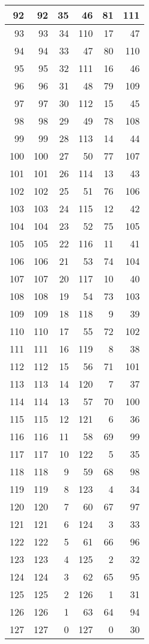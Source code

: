 \begin{longtable}{|r|r|r|r|r|r|}
      92&92&35&46&81&111\\
      \hline 
      93&93&34&110&17&47\\
      \hline 
      94&94&33&47&80&110\\
      \hline 
      95&95&32&111&16&46\\
      \hline 
      96&96&31&48&79&109\\
      \hline 
      97&97&30&112&15&45\\
      \hline 
      98&98&29&49&78&108\\
      \hline 
      99&99&28&113&14&44\\
      \hline 
      100&100&27&50&77&107\\
      \hline 
      101&101&26&114&13&43\\
      \hline 
      102&102&25&51&76&106\\
      \hline 
      103&103&24&115&12&42\\
      \hline 
      104&104&23&52&75&105\\
      \hline 
      105&105&22&116&11&41\\
      \hline 
      106&106&21&53&74&104\\
      \hline 
      107&107&20&117&10&40\\
      \hline 
      108&108&19&54&73&103\\
      \hline 
      109&109&18&118&9&39\\
      \hline 
      110&110&17&55&72&102\\
      \hline 
      111&111&16&119&8&38\\
      \hline 
      112&112&15&56&71&101\\
      \hline 
      113&113&14&120&7&37\\
      \hline 
      114&114&13&57&70&100\\
      \hline 
      115&115&12&121&6&36\\
      \hline 
      116&116&11&58&69&99\\
      \hline 
      117&117&10&122&5&35\\
      \hline 
      118&118&9&59&68&98\\
      \hline 
      119&119&8&123&4&34\\
      \hline 
      120&120&7&60&67&97\\
      \hline 
      121&121&6&124&3&33\\
      \hline 
      122&122&5&61&66&96\\
      \hline 
      123&123&4&125&2&32\\
      \hline 
      124&124&3&62&65&95\\
      \hline 
      125&125&2&126&1&31\\
      \hline 
      126&126&1&63&64&94\\
      \hline 
      127&127&0&127&0&30\\
      \hline
    \end{longtable}
    \label{tab:var_orders}

